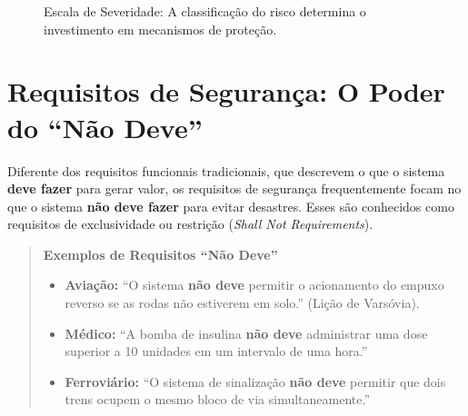 \documentclass[12pt,a4paper,twoside]{report}
\begin{document}
\begin{figure}[h]
    \centering
    \caption{Escala de Severidade: A classificação do risco determina o investimento em mecanismos de proteção.}
\end{figure}

\section{Requisitos de Segurança: O Poder do ``Não Deve''}

Diferente dos requisitos funcionais tradicionais, que descrevem o que o sistema \textbf{deve fazer} para gerar valor, os requisitos de segurança frequentemente focam no que o sistema \textbf{não deve fazer} para evitar desastres. Esses são conhecidos como requisitos de exclusividade ou restrição (\emph{Shall Not Requirements}).

\begin{quote}
\textbf{Exemplos de Requisitos ``Não Deve''}
    \begin{itemize}
        \item \textbf{Aviação:} ``O sistema \textbf{não deve} permitir o acionamento do empuxo reverso se as rodas não estiverem em solo.'' (Lição de Varsóvia).
        \item \textbf{Médico:} ``A bomba de insulina \textbf{não deve} administrar uma dose superior a 10 unidades em um intervalo de uma hora.''
        \item \textbf{Ferroviário:} ``O sistema de sinalização \textbf{não deve} permitir que dois trens ocupem o mesmo bloco de via simultaneamente.''
    \end{itemize}
\end{quote}
\end{document}
